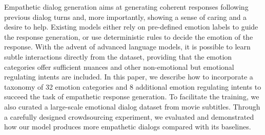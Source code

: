 Empathetic dialog generation aims at generating coherent responses following previous dialog turns and, more importantly, showing a sense of caring and a desire to help. Existing models either rely on pre-defined emotion labels to guide the response generation, or use deterministic rules to decide the emotion of the response. With the advent of advanced language models, it is possible to learn subtle interactions directly from the dataset, providing that the emotion categories offer sufficient nuances and other non-emotional but emotional regulating intents are included. In this paper, we describe how to incorporate a taxonomy of 32 emotion categories and 8 additional emotion regulating intents to succeed the task of empathetic response generation. To facilitate the training, we also curated a large-scale emotional dialog dataset from movie subtitles. Through a carefully designed crowdsourcing experiment, we evaluated and demonstrated how our model produces more empathetic dialogs compared with its baselines.
